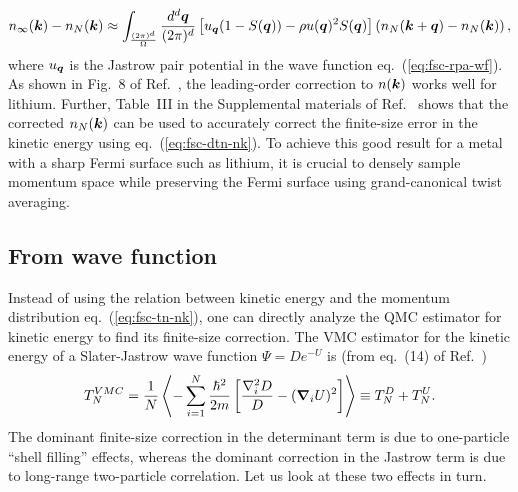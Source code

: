 \begin{align} \label{eq:fsc-dnk-lo}
n_{\infty}(\boldsymbol{k}) - n_N(\boldsymbol{k}) \approx \int_{\frac{(2\pi)^d}{\Omega}}
\dfrac{d^d\boldsymbol{q}}{(2\pi)^d}
\left[
u_{\boldsymbol{q}}(1-S(\boldsymbol{q}))-\rho u(\boldsymbol{q})^2S(\boldsymbol{q})
\right]
\left(
n_N(\boldsymbol{k}+\boldsymbol{q})-n_N(\boldsymbol{k})
\right),
\end{align}
where $u_{\boldsymbol{q}}$ is the Jastrow pair potential in the wave function eq.~(\ref{eq:fsc-rpa-wf}).
As shown in Fig.~8 of Ref.~\cite{Yang2020-licp}, the leading-order correction to $n(\boldsymbol{k})$ works well for lithium. Further, Table~III in the Supplemental materials of Ref.~\cite{Yang2020-licp} shows that the corrected $n_N(\boldsymbol{k})$ can be used to accurately correct the finite-size error in the kinetic energy using eq.~(\ref{eq:fsc-dtn-nk}). To achieve this good result for a metal with a sharp Fermi surface such as lithium, it is crucial to densely sample momentum space while preserving the Fermi surface using grand-canonical twist averaging.

\subsection{From wave function}
Instead of using the relation between kinetic energy and the momentum distribution eq.~(\ref{eq:fsc-tn-nk}), one can directly analyze the QMC estimator for kinetic energy to find its finite-size correction. The VMC estimator for the kinetic energy of a Slater-Jastrow wave function $\Psi=De^{-U}$ is (from eq.~(14) of Ref.~\cite{Holzmann2016})
\begin{align} \label{eq:fsc-tn-vmc}
T_N^{VMC} = \frac{1}{N}\left\langle
-\sum\limits_{i=1}^N \dfrac{\hbar^2}{2m}\left[
\dfrac{\nabla_i^2D}{D} - (\boldsymbol{\nabla}_i U)^2
\right]
\right\rangle\equiv T_N^D + T_N^U.
\end{align}
The dominant finite-size correction in the determinant term is due to one-particle ``shell filling'' effects, whereas the dominant correction in the Jastrow term is due to long-range two-particle correlation. Let us look at these two effects in turn.
